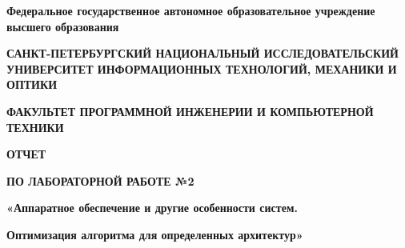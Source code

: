 \documentclass[12pt]{article}
\begin{document}
\pagestyle{empty}
\begin{center}
\normalsize
\textbf{Федеральное государственное автономное образовательное учреждение высшего образования}

\small
\medskip 
\textbf{САНКТ-ПЕТЕРБУРГСКИЙ НАЦИОНАЛЬНЫЙ ИССЛЕДОВАТЕЛЬСКИЙ  УНИВЕРСИТЕТ ИНФОРМАЦИОННЫХ ТЕХНОЛОГИЙ, МЕХАНИКИ И ОПТИКИ}

\medskip 
\textbf{ФАКУЛЬТЕТ ПРОГРАММНОЙ ИНЖЕНЕРИИ И КОМПЬЮТЕРНОЙ ТЕХНИКИ}
\end{center}
\bigskip\bigskip\bigskip\bigskip\bigskip\bigskip\bigskip\bigskip\bigskip\bigskip\bigskip\bigskip
\begin{center}
\par\medskip\par\smallskip
\Large
 
\par\smallskip
\textbf{ОТЧЕТ} 

\textbf{ПО ЛАБОРАТОРНОЙ РАБОТЕ №2}

\large
\par\bigskip
\textbf{«Аппаратное обеспечение и другие особенности систем.} 

\textbf{Оптимизация алгоритма для определенных архитектур»}
\par\bigskip\par\bigskip\par\bigskip\par\bigskip\par\bigskip\par\bigskip
\par\bigskip\par\bigskip\par\bigskip\par\bigskip\par\bigskip\par\bigskip
\par\bigskip\par\bigskip\par\bigskip\par\bigskip\par\bigskip\par\bigskip
\end{center}
\end{document}
